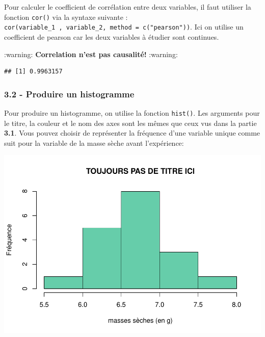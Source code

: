 \documentclass[
]{article}
\newenvironment{Shaded}{\begin{snugshade}}{\end{snugshade}}
\newcommand{\DataTypeTok}[1]{\textcolor[rgb]{0.13,0.29,0.53}{#1}}
\newcommand{\KeywordTok}[1]{\textcolor[rgb]{0.13,0.29,0.53}{\textbf{#1}}}
\newcommand{\NormalTok}[1]{#1}
\newcommand{\OperatorTok}[1]{\textcolor[rgb]{0.81,0.36,0.00}{\textbf{#1}}}
\newcommand{\StringTok}[1]{\textcolor[rgb]{0.31,0.60,0.02}{#1}}
\begin{document}
Pour calculer le coefficient de corrélation entre deux variables, il
faut utiliser la fonction \texttt{cor()} via la syntaxe suivante :
\texttt{cor(variable\_1\ ,\ variable\_2,\ method\ =\ c("pearson"))}. Ici
on utilise un coefficient de pearson car les deux variables à étudier
sont continues.

:warning: \textbf{Correlation n'est pas causalité! } :warning:

\begin{Shaded}
\end{Shaded}

\begin{verbatim}
## [1] 0.9963157
\end{verbatim}

\hypertarget{produire-un-histogramme}{%
\subsubsection{3.2 - Produire un
histogramme}\label{produire-un-histogramme}}

Pour produire un histogramme, on utilise la fonction \texttt{hist()}.
Les arguments pour le titre, la couleur et le nom des axes sont les
mêmes que ceux vus dans la partie \textbf{3.1}. Vous pouvez choisir de
représenter la fréquence d'une variable unique comme suit pour la
variable de la masse sèche avant l'expérience:

\begin{Shaded}
\end{Shaded}

\includegraphics{Utilisation_R_base_files/figure-latex/unnamed-chunk-13-1.pdf}
\end{document}
